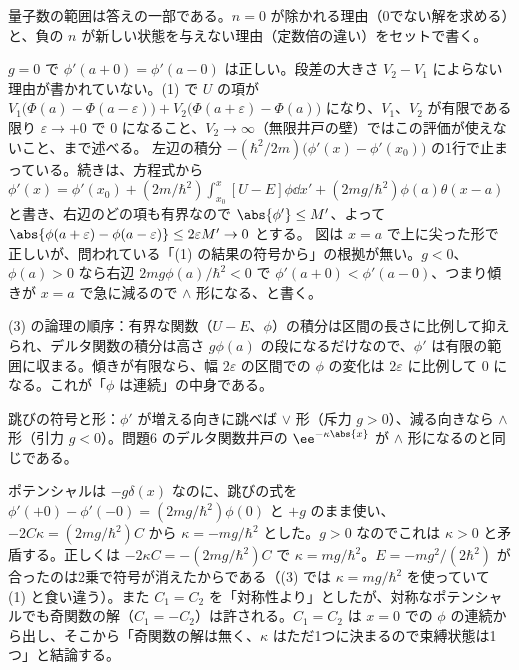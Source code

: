 \begin{rikai}
  \item 量子数の範囲は答えの一部である。$n=0$ が除かれる理由（0でない解を求める）と、負の $n$ が新しい状態を与えない理由（定数倍の違い）をセットで書く。
\end{rikai}
\begin{kotaeran}
   $g=0$ で $\phi'(a+0)=\phi'(a-0)$ は正しい。段差の大きさ $V_{2}-V_{1}$ によらない理由が書かれていない。(1) で $U$ の項が $V_{1}\bigl(\Phi(a)-\Phi(a-\varepsilon)\bigr)+V_{2}\bigl(\Phi(a+\varepsilon)-\Phi(a)\bigr)$ になり、$V_{1}$、$V_{2}$ が有限である限り $\varepsilon\to+0$ で $0$ になること、$V_{2}\to\infty$（無限井戸の壁）ではこの評価が使えないこと、まで述べる。
   左辺の積分 $-(\hbar^{2}/2m)\bigl(\phi'(x)-\phi'(x_{0})\bigr)$ の1行で止まっている。続きは、方程式から $\phi'(x)=\phi'(x_{0})+(2m/\hbar^{2})\int_{x_{0}}^{x}[U-E]\phi\dd x'+(2mg/\hbar^{2})\phi(a)\theta(x-a)$ と書き、右辺のどの項も有界なので $\abs{\phi'}\le M'$、よって $\abs{\phi(a+\varepsilon)-\phi(a-\varepsilon)}\le 2\varepsilon M'\to0$ とする。
   図は $x=a$ で上に尖った形で正しいが、問われている「(1) の結果の符号から」の根拠が無い。$g<0$、$\phi(a)>0$ なら右辺 $2mg\phi(a)/\hbar^{2}<0$ で $\phi'(a+0)<\phi'(a-0)$、つまり傾きが $x=a$ で急に減るので $\wedge$ 形になる、と書く。
\end{kotaeran}
\begin{rikai}
  \item (3) の論理の順序：有界な関数（$U-E$、$\phi$）の積分は区間の長さに比例して抑えられ、デルタ関数の積分は高さ $g\phi(a)$ の段になるだけなので、$\phi'$ は有限の範囲に収まる。傾きが有限なら、幅 $2\varepsilon$ の区間での $\phi$ の変化は $2\varepsilon$ に比例して $0$ になる。これが「$\phi$ は連続」の中身である。
  \item 跳びの符号と形：$\phi'$ が増える向きに跳べば $\vee$ 形（斥力 $g>0$）、減る向きなら $\wedge$ 形（引力 $g<0$）。問題6 のデルタ関数井戸の $\ee^{-\kappa\abs{x}}$ が $\wedge$ 形になるのと同じである。
\end{rikai}
\begin{kotaeran}
   ポテンシャルは $-g\delta(x)$ なのに、跳びの式を $\phi'(+0)-\phi'(-0)=(2mg/\hbar^{2})\phi(0)$ と $+g$ のまま使い、$-2C\kappa=(2mg/\hbar^{2})C$ から $\kappa=-mg/\hbar^{2}$ とした。$g>0$ なのでこれは $\kappa>0$ と矛盾する。正しくは $-2\kappa C=-(2mg/\hbar^{2})C$ で $\kappa=mg/\hbar^{2}$。$E=-mg^{2}/(2\hbar^{2})$ が合ったのは2乗で符号が消えたからである（(3) では $\kappa=mg/\hbar^{2}$ を使っていて (1) と食い違う）。また $C_{1}=C_{2}$ を「対称性より」としたが、対称なポテンシャルでも奇関数の解（$C_{1}=-C_{2}$）は許される。$C_{1}=C_{2}$ は $x=0$ での $\phi$ の連続から出し、そこから「奇関数の解は無く、$\kappa$ はただ1つに決まるので束縛状態は1つ」と結論する。
\end{kotaeran}
